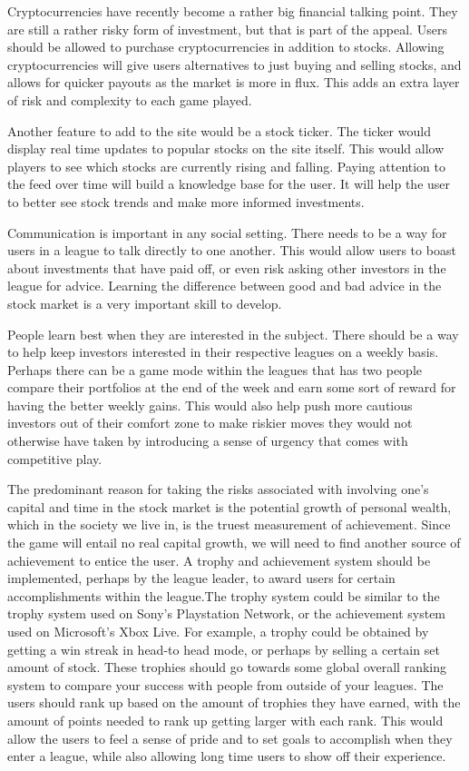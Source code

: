 \documentclass[11pt,letterpaper,oneside]{memoir}
\begin{document}
Cryptocurrencies have recently become a rather big financial talking point. They are still a rather risky form of investment, but that is part of the appeal. Users should be allowed to purchase cryptocurrencies in addition to stocks. Allowing cryptocurrencies will give users alternatives to just buying and selling stocks, and allows for quicker payouts as the market is more in flux. This adds an extra layer of risk and complexity to each game played. \par
Another feature to add to the site would be a stock ticker. The ticker would display real time updates to popular stocks on the site itself. This would allow players to see which stocks are currently rising and falling. Paying attention to the feed over time will build a knowledge base for the user. It will help the user to better see stock trends and make more informed investments. \par
Communication is important in any social setting. There needs to be a way for users in a league to talk directly to one another. This would allow users to boast about investments that have paid off, or even risk asking other investors in the league for advice. Learning the difference between good and bad advice in the stock market is a very important skill to develop. \par
People learn best when they are interested in the subject. There should be a way to help keep investors interested in their respective leagues on a weekly basis. Perhaps there can be a game mode within the leagues that has two people compare their portfolios at the end of the week and earn some sort of reward for having the better weekly gains. This would also help push more cautious investors out of their comfort zone to make riskier moves they would not otherwise have taken by introducing a sense of urgency that comes with competitive play.  \par
The predominant reason for taking the risks associated with involving one's capital and time in the stock market is the potential growth of personal wealth, which in the society we live in, is the truest measurement of achievement. Since the game will entail no real capital growth, we will need to find another source of achievement to entice the user. A trophy and achievement system should be implemented, perhaps by the league leader, to award users for certain accomplishments within the league.The trophy system could be similar to the trophy system used on Sony’s Playstation Network, or the achievement system used on Microsoft's Xbox Live. For example, a trophy could be obtained by getting a win streak in head-to head mode, or perhaps by selling a certain set amount of stock. These trophies should go towards some global overall ranking system to compare your success with people from outside of your leagues. The users should rank up based on the amount of trophies they have earned, with the amount of points needed to rank up getting larger with each rank. This would allow the users to feel a sense of pride and to set goals to accomplish when they enter a league, while also allowing long time users to show off their experience. \par
\end{document}
